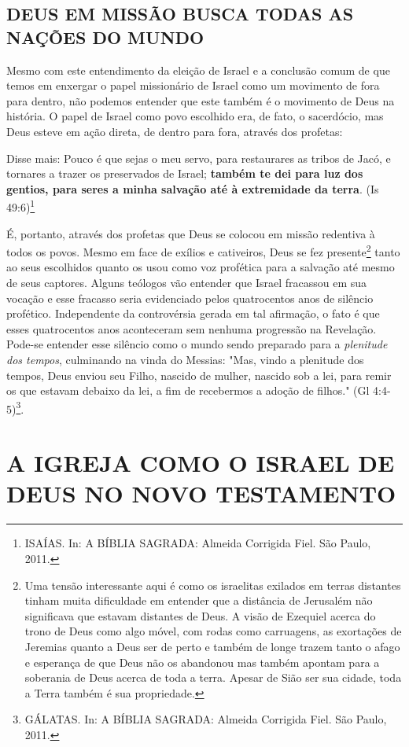 \documentclass[
    article,            %
	12pt,				%
	oneside,			%
	a4paper,			%
	chapter=TITLE,		%
	section=TITLE,		%
	english,			%
	french,				%
	spanish,			%
	brazil				%
	]{abntex2}
\begin{document}
\subsection{DEUS EM MISSÃO BUSCA TODAS AS NAÇÕES DO MUNDO}
Mesmo com este entendimento da eleição de Israel e a conclusão comum de que temos em enxergar o papel missionário de Israel como um movimento de fora para dentro, não podemos entender que este também é o movimento de Deus na história. O papel de Israel como povo escolhido era, de fato, o sacerdócio, mas Deus esteve em ação direta, de dentro para fora, através dos profetas:
\begin{citacao}
Disse mais: Pouco é que sejas o meu servo, para restaurares as tribos de Jacó, e tornares a trazer os preservados de Israel; \textbf{também te dei para luz dos gentios, para seres a minha salvação até à extremidade da terra}. (Is 49:6)\footnote{ISAÍAS. In: A BÍBLIA SAGRADA: Almeida Corrigida Fiel. São Paulo, 2011.}
\end{citacao}
É, portanto, através dos profetas que Deus se colocou em missão redentiva à todos os povos. Mesmo em face de exílios e cativeiros, Deus se fez presente\footnote{Uma tensão interessante aqui é como os israelitas exilados em terras distantes tinham muita dificuldade em entender que a distância de Jerusalém não significava que estavam distantes de Deus. A visão de Ezequiel acerca do trono de Deus como algo móvel, com rodas como carruagens, as exortações de Jeremias quanto a Deus ser de perto e também de longe trazem tanto o afago e esperança de que Deus não os abandonou mas também apontam para a soberania de Deus acerca de toda a terra. Apesar de Sião ser sua cidade, toda a Terra também é sua propriedade.} tanto ao seus escolhidos quanto os usou como voz profética para a salvação até mesmo de seus captores. Alguns teólogos vão entender que Israel fracassou em sua vocação e esse fracasso seria evidenciado pelos quatrocentos anos de silêncio profético. Independente da controvérsia gerada em tal afirmação, o fato é que esses quatrocentos anos aconteceram sem nenhuma progressão na Revelação. Pode-se entender esse silêncio como o mundo sendo preparado para a \emph{plenitude dos tempos}, culminando na vinda do Messias: "Mas, vindo a plenitude dos tempos, Deus enviou seu Filho, nascido de mulher, nascido sob a lei, para remir os que estavam debaixo da lei, a fim de recebermos a adoção de filhos." (Gl 4:4-5)\footnote{GÁLATAS. In: A BÍBLIA SAGRADA: Almeida Corrigida Fiel. São Paulo, 2011.}.
\section{A IGREJA COMO O ISRAEL DE DEUS NO NOVO TESTAMENTO}
\end{document}

